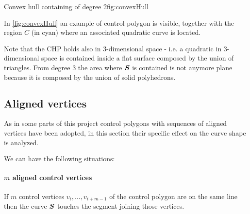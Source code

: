\documentclass[dissertation.tex]{subfiles}
\begin{document}
\begin{myfig}{Convex hull containing \bs of degree 2}{fig:convexHull}
\end{myfig}
In \cref{fig:convexHull} an example of control polygon is visible,
together with the region $C$ (in cyan) where an associated quadratic
\bs curve is located.

Note that the \ac{CHP} holds also in
3-dimensional
space - i.e. a quadratic \bs in 3-dimensional space is contained
inside a flat surface composed by the union of triangles. From degree 3
the area where $\boldsymbol{S}$ is contained is not anymore plane
because it is composed by the union of solid polyhedrons.

\subsection{Aligned vertices}\label{sec:alignedVertices}
As in some parts of this project control polygons with sequences of
aligned vertices have been adopted, in this section their specific
effect on the curve shape is analyzed. 

We can have the following situations:
\paragraph{$m$ aligned control vertices}
If $m$ control vertices $v_i,\dots,v_{i+m-1}$ of the control polygon
are on the same line then
the curve $\boldsymbol{S}$ touches the segment joining those vertices.
\end{document}
